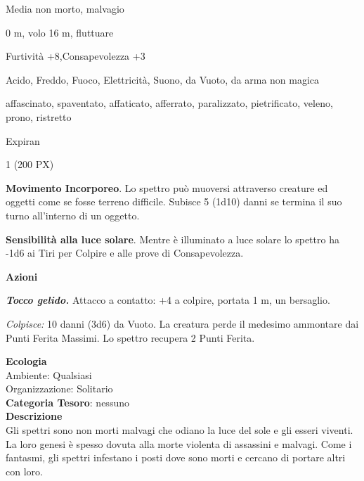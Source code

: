 \begin{multicols}{2}
{
\begin{description}[noitemsep, topsep=0pt, parsep=0pt, partopsep=0pt, itemsep=1pt, leftmargin=2.35cm,  labelwidth=2.2cm, itemindent=0cm, listparindent=0pt] %
\setlength{\baselineskip}{10pt}
\item[\textbf{Taglia/Tipo}] Media non morto, malvagio
\item[\textbf{Caratt.}] 
\item[\textbf{Punti Ferita}] 
\item[\textbf{Movimento}] 0 m, volo 16 m, fluttuare
\item[\textbf{Tiri Salvez.}] 
\item[\textbf{Comp.}] Furtività +8,Consapevolezza +3
\item[\textbf{Res. Danni}] Acido, Freddo, Fuoco, Elettricità, Suono, da Vuoto, da arma non magica
\item[\textbf{Immunità}] affascinato, spaventato, affaticato, afferrato, paralizzato, pietrificato, veleno, prono, ristretto
\item[\textbf{Sensi}] 
\item[\textbf{Lingue}] Expiran
\item[\textbf{Sfida}] 1 (200 PX)
\end{description}
\smallskip

\textbf{Movimento Incorporeo}. Lo spettro può muoversi attraverso creature ed oggetti come se fosse terreno difficile. Subisce 5 (1d10) danni se termina il suo turno all'interno di un oggetto.

\textbf{Sensibilità alla luce solare}. Mentre è illuminato a luce solare lo spettro ha -1d6 ai Tiri per Colpire e alle prove di Consapevolezza.

\textbf{Azioni}

\emph{\textbf{Tocco gelido.}} Attacco a contatto: +4 a colpire, portata 1 m, un bersaglio.

\emph{Colpisce:} 10 danni (3d6) da Vuoto. La creatura perde il medesimo ammontare dai Punti Ferita Massimi. Lo spettro recupera 2 Punti Ferita.

\textbf{Ecologia}\\
Ambiente: Qualsiasi\\
Organizzazione: Solitario\\
\textbf{Categoria Tesoro}: nessuno\\
\textbf{Descrizione}\\
Gli spettri sono non morti malvagi che odiano la luce del sole e gli esseri viventi. La loro genesi è spesso dovuta alla morte violenta di assassini e malvagi. Come i fantasmi, gli spettri infestano i posti dove sono morti e cercano di portare altri con loro.

}
\end{multicols}
